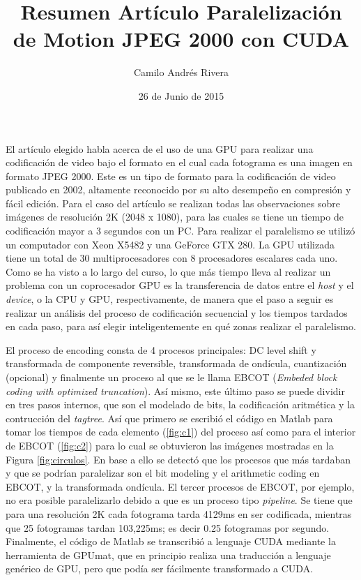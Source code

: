 \documentclass{article}
\title{Resumen Artículo Paralelización de Motion JPEG 2000 con CUDA}
\author{Camilo Andrés Rivera}
\date{26 de Junio de 2015}
\begin{document}
\maketitle

El artículo elegido \cite{articulo} habla acerca de el uso de una GPU para realizar una codificación de video bajo el formato en el cual cada fotograma es una imagen en formato JPEG 2000. Este es un tipo de formato para la codificación de video publicado en 2002, altamente reconocido por su alto desempeño en compresión y fácil edición. Para el caso del artículo se realizan todas las observaciones sobre imágenes de resolución 2K (2048 x 1080), para las cuales se tiene un tiempo de codificación mayor a 3 segundos con un PC. Para realizar el paralelismo se utilizó un computador con Xeon X5482 y una GeForce GTX 280. La GPU utilizada tiene un total de 30 multiprocesadores con 8 procesadores escalares cada uno. Como se ha visto a lo largo del curso, lo que más tiempo lleva al realizar un problema con un coprocesador GPU es la transferencia de datos entre el \textit{host} y el \textit{device}, o la CPU y GPU, respectivamente, de manera que el paso a seguir es realizar un análisis del proceso de codificación secuencial y los tiempos tardados en cada paso, para así elegir inteligentemente en qué zonas realizar el paralelismo.

El proceso de encoding consta de 4 procesos principales: DC level shift y transformada de componente reversible, transformada de ondícula, cuantización (opcional) y finalmente un proceso al que se le llama EBCOT (\textit{Embeded block coding with optimized truncation}). Así mismo, este último paso se puede dividir en tres pasos internos, que son el modelado de bits, la codificación aritmética y la contrucción del \textit{tagtree}. Así que primero se escribió el código en Matlab para tomar los tiempos de cada elemento (\ref{fig:c1}) del proceso así como para el interior de EBCOT (\ref{fig:c2}) para lo cual se obtuvieron las imágenes mostradas en la Figura \ref{fig:circulos}. En base a ello se detectó que los procesos que más tardaban y que se podrían paralelizar son el bit modeling y el arithmetic coding en EBCOT, y la transformada ondícula. El tercer procesos de EBCOT, por ejemplo, no era posible paralelizarlo debido a que es un proceso tipo \textit{pipeline}. Se tiene que para una resolución 2K cada fotograma tarda 4129ms en ser codificada, mientras que 25 fotogramas tardan 103,225ms; es decir 0.25 fotogramas por segundo. Finalmente, el código de Matlab se transcribió a lenguaje CUDA mediante la herramienta de GPUmat, que en principio realiza una traducción a lenguaje genérico de GPU, pero que podía ser fácilmente transformado a CUDA.
\end{document}
